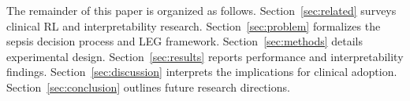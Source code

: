 The remainder of this paper is organized as follows. Section~\ref{sec:related} surveys clinical RL and interpretability research. Section~\ref{sec:problem} formalizes the sepsis decision process and LEG framework. Section~\ref{sec:methods} details experimental design. Section~\ref{sec:results} reports performance and interpretability findings. Section~\ref{sec:discussion} interprets the implications for clinical adoption. Section~\ref{sec:conclusion} outlines future research directions.

